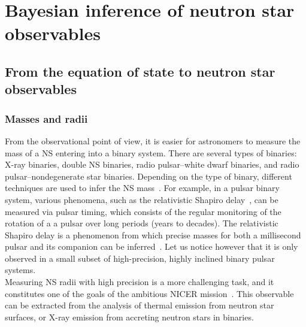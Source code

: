 %

\chapter{Bayesian inference of neutron star observables} %

\section{From the equation of state to neutron star observables} %


\subsection{Masses and radii} %

From the observational point of view, it is easier for astronomers to measure 
the mass of a NS entering into a binary system. There are several types of
binaries: X-ray binaries, double NS binaries, radio pulsar--white dwarf 
binaries, and radio pulsar--nondegenerate star binaries. Depending on the type 
of binary, different techniques are used to infer the NS 
mass~\cite{Haensel2007}.
For example, in a pulsar binary system, various phenomena, such as the 
relativistic Shapiro delay~\cite{Shapiro1964}, can be measured via pulsar 
timing, which consists of the regular monitoring of the rotation of a a pulsar 
over long periods (years to decades). The relativistic Shapiro delay is a 
phenomenon from which precise masses for both a millisecond pulsar and its 
companion can be inferred~\cite{Demorest2010,Cromartie2020}. Let us notice 
however that it is only observed in a small subset of high-precision, highly 
inclined binary pulsar systems.\\
Measuring NS radii with high precision is a more challenging task, and it
constitutes one of the goals of the ambitious NICER mission~\cite{NICER}. This
observable can be extracted from the analysis of thermal emission from neutron 
star surfaces, or X-ray emission from accreting neutron stars in binaries.

